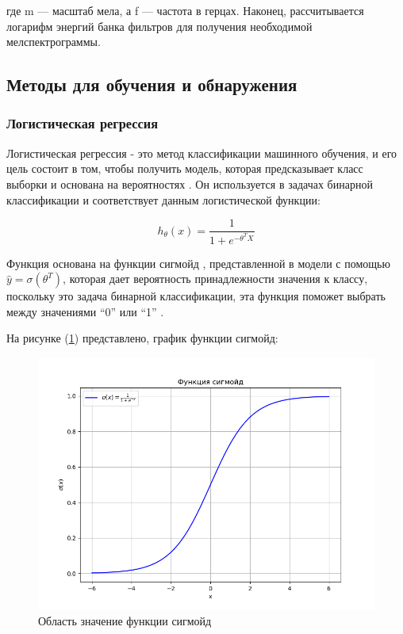 где m — масштаб мела, а f — частота в герцах. Наконец, рассчитывается логарифм энергий банка фильтров для получения необходимой мелспектрограммы.

\subsection{Методы для обучения и обнаружения}

\subsubsection{Логистическая регрессия}

Логистическая регрессия - это метод классификации машинного обучения, и его цель состоит в том, чтобы получить модель, которая предсказывает класс выборки и основана на вероятностях \cite{isak2020logistic}. Он используется в задачах бинарной классификации и соответствует данным логистической функции:

\begin{equation}
    h_{\theta}(x) = \frac{1}{1 + e^{-\theta^{T} X}}
\end{equation}

Функция основана на функции сигмойд \cite{fig:sigmoid-func}, представленной в модели с помощью \(\hat{y} = \sigma (\theta^{T})\), которая дает вероятность принадлежности значения к классу, поскольку это задача бинарной классификации, эта функция поможет выбрать между значениями “0” или “1” \cite{javed2012automatic}.

На рисунке (\ref{fig:sigmoid-func}) представлено, график функции сигмойд: 
\begin{figure}[H]
	\centering
	\includegraphics[width=0.8\linewidth]{images/sigmoid.png}
	\caption{Область значение функции сигмойд}
	\label{fig:sigmoid-func}
\end{figure}


